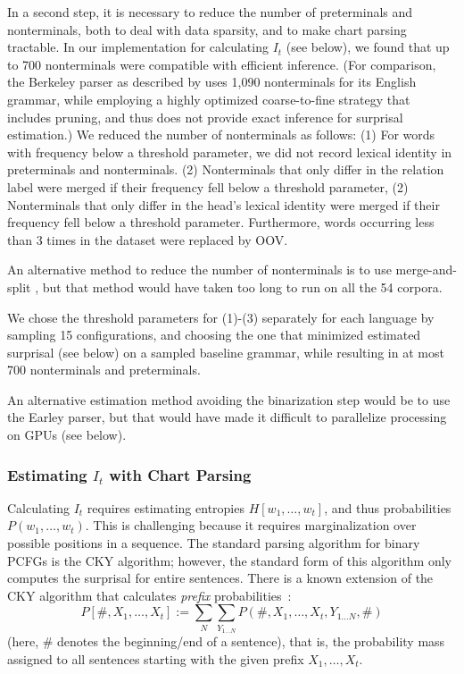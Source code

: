 \documentclass[11pt,letterpaper]{article}
\begin{document}
In a second step, it is necessary to reduce the number of preterminals and nonterminals, both to deal with data sparsity, and to make chart parsing tractable.
In our implementation for calculating $I_t$ (see below), we found that up to 700 nonterminals were compatible with efficient inference.
(For comparison, the Berkeley parser as described by \citet{DBLP:conf/aaai/PetrovK07} uses 1,090 nonterminals for its English grammar, while employing a highly optimized coarse-to-fine strategy that includes pruning, and thus does not provide exact inference for surprisal estimation.)
We reduced the number of nonterminals as follows:
(1) For words with frequency below a threshold parameter, we did not record lexical identity in preterminals and nonterminals.
(2) Nonterminals that only differ in the relation label were merged if their frequency fell below a threshold parameter,
(2) Nonterminals that only differ in the head's lexical identity were merged if their frequency fell below a threshold parameter.
Furthermore, words occurring less than 3 times in the dataset were replaced by OOV.

An alternative method to reduce the number of nonterminals is to use merge-and-split \citep{DBLP:conf/aaai/PetrovK07}, but that method would have taken too long to run on all the 54 corpora.

We chose the threshold parameters for (1)-(3) separately for each language by sampling 15 configurations, and choosing the one that minimized estimated surprisal (see below) on a sampled baseline grammar, while resulting in at most 700 nonterminals and preterminals.

An alternative estimation method avoiding the binarization step would be to use the Earley parser, but that would have made it difficult to parallelize processing on GPUs (see below).

\subsubsection{Estimating $I_t$ with Chart Parsing}

Calculating $I_t$ requires estimating entropies $H[w_1, \dots, w_t]$, and thus probabilities $P(w_1, \dots, w_t)$.
This is challenging because it requires marginalization over possible positions in a sequence.
The standard parsing algorithm for binary PCFGs is the CKY algorithm; however, the standard form of this algorithm only computes the surprisal for entire sentences.
There is a known extension of the CKY algorithm that calculates \emph{prefix} probabilities~\citep{DBLP:journals/coling/JelinekL91,DBLP:journals/coling/Stolcke95,DBLP:journals/coling/Goodman99}:
\begin{equation}
P[\#, X_1, \dots, X_t] := \sum_N \sum_{Y_{1\dots N}} P(\#, X_1, \dots, X_t, Y_{1\dots N}, \#)
\end{equation}
(here, $\#$ denotes the beginning/end of a sentence), that is, the probability mass assigned to all sentences starting with the given prefix $X_1, \dots, X_t$.
\end{document}
